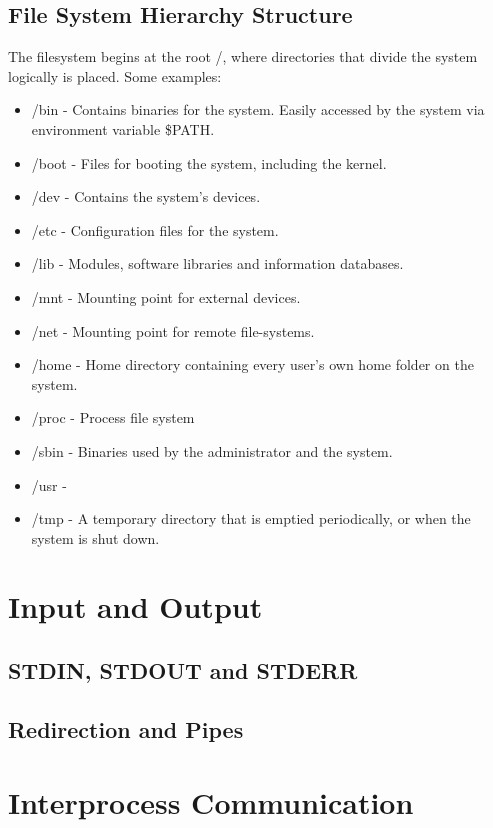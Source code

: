 \documentclass[12pt]{article}
\begin{document}
\subsection{File System Hierarchy Structure}
  The filesystem begins at the root /, where directories that divide the system logically is placed. Some examples:
  \begin{itemize}
    \item /bin - Contains binaries for the system. Easily accessed by the system via environment variable \$PATH.
    \item /boot - Files for booting the system, including the kernel.
    \item /dev - Contains the system's devices.
    \item /etc - Configuration files for the system.
    \item /lib - Modules, software libraries and information databases.
    \item /mnt - Mounting point for external devices.
    \item /net - Mounting point for remote file-systems.
    \item /home - Home directory containing every user's own home folder on the system. 
    \item /proc - Process file system
    \item /sbin - Binaries used by the administrator and the system.
    \item /usr -
    \item /tmp - A temporary directory that is emptied periodically, or when the system is shut down.
  \end{itemize}
 
\section{Input and Output} %
\subsection{STDIN, STDOUT and STDERR}
\subsection{Redirection and Pipes}

\section{Interprocess Communication} %
\end{document}
